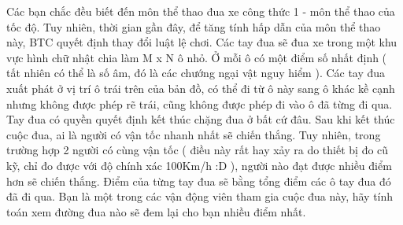 Các bạn chắc đều biết đến môn thể thao đua xe công thức 1 - môn thể thao của tốc độ. Tuy nhiên, thời gian gần đây, để tăng tính hấp dẫn của môn thể thao này, BTC quyết định thay đổi luật lệ chơi. Các tay đua sẽ đua xe trong một khu vực hình chữ nhật chia làm M x N ô nhỏ. Ở mỗi ô có một điểm số nhất định ( tất nhiên có thể là số âm, đó là các chướng ngại vật nguy hiểm ). Các tay đua xuất phát ở vị trí ô trái trên của bản đồ, có thể đi từ ô này sang ô khác kề cạnh nhưng không được phép rẽ trái, cũng không được phép đi vào ô đã từng đi qua. Tay đua có quyền quyết định kết thúc chặng đua ở bất cứ đâu. Sau khi kết thúc cuộc đua, ai là người có vận tốc nhanh nhất sẽ chiến thắng. Tuy nhiên, trong trường hợp 2 người có cùng vận tốc ( điều này rất hay xảy ra do thiết bị đo cũ kỹ, chỉ đo được với độ chính xác 100Km/h :D ), người nào đạt được nhiều điểm hơn sẽ chiến thắng. Điểm của từng tay đua sẽ bằng tổng điểm các ô tay đua đó đã đi qua. Bạn là một trong các vận động viên tham gia cuộc đua này, hãy tính toán xem đường đua nào sẽ đem lại cho bạn nhiều điểm nhất.